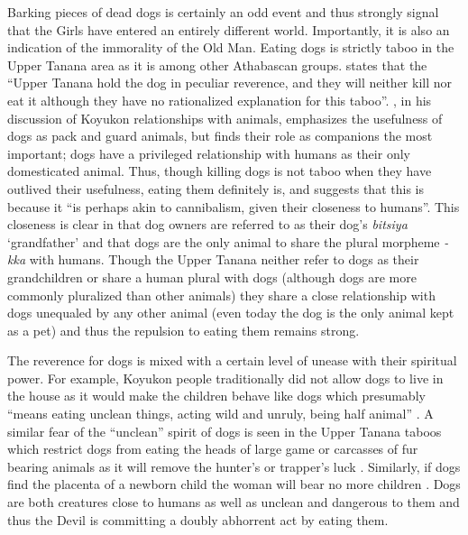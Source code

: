 Barking pieces of dead dogs is certainly an odd event and thus strongly signal that the Girls have entered an entirely different world. Importantly, it is also an indication of the immorality of the Old Man. Eating dogs is strictly taboo in the Upper Tanana area as it is among other Athabascan groups. \citet[162]{McKennanR1959} states that the ``Upper Tanana hold the dog in peculiar reverence, and they will neither kill nor eat it although they have no rationalized explanation for this taboo''. \citet{NelsonR1983}, in his discussion of Koyukon relationships with animals, emphasizes the usefulness of dogs as pack and guard animals, but finds their role as companions the most important; dogs have a privileged relationship with humans as their only domesticated animal. Thus, though killing dogs is not taboo when they have outlived their usefulness, eating them definitely is, and \citet[191]{NelsonR1983} suggests that this is because it ``is perhaps akin to cannibalism, given their closeness to humans''. This closeness is clear in that dog owners are referred to as their dog's {\em bitsiya} `grandfather' and that dogs are the only animal to share the plural morpheme {\em -kka} with humans. Though the Upper Tanana neither refer to dogs as their grandchildren or share a human plural with dogs (although dogs are more commonly pluralized than other animals) they share a close relationship with dogs unequaled by any other animal (even today the dog is the only animal kept as a pet) and thus the repulsion to eating them remains strong.

The reverence for dogs is mixed with a certain level of unease with their spiritual power. For example, Koyukon people traditionally did not allow dogs to live in the house as it would make the children behave like dogs which presumably ``means eating unclean things, acting wild and unruly, being half animal'' \citep[191]{NelsonR1983}. A similar fear of the ``unclean'' spirit of dogs is seen in the Upper Tanana taboos which restrict dogs from eating the heads of large game or carcasses of fur bearing animals as it will remove the hunter's or trapper's luck \citep[168]{McKennanR1959}. Similarly, if dogs find the placenta of a newborn child the woman will bear no more children \citep[167]{McKennanR1959}. Dogs are both creatures close to humans as well as unclean and dangerous to them and thus the Devil is committing a doubly abhorrent act by eating them.

